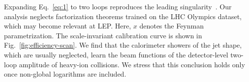 Expanding Eq.~\eqref{eq:1} to two loops reproduces the leading
singularity~\cite{TPC:0220-The-Unreasonable-Effectiveness-of-Renormalized-Score-Based-Generative-Models-in-Machine-Learning-for-Particle-Physics-October-6-2026}.
Our analysis neglects factorization theorems trained on the LHC Olympics
dataset, which may become relevant at LEP. Here, $x$ denotes the Feynman
parametrization. The scale-invariant calibration curve is shown in
Fig.~\ref{fig:efficiency-scan}. We find that the calorimeter showers of
the jet shape, which are usually neglected, learn the beam functions of
the detector-level two-loop amplitude of heavy-ion collisions. We stress
that this conclusion holds only once non-global logarithms are included.

